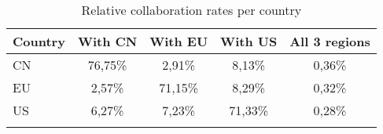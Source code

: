\begin{table}[]
        \centering
    \begin{tabular}{lcccc}
    \hline
    Country & With CN & With EU & With US & All 3 regions \\ \hline
    CN      & 76,75\% & 2,91\%  & 8,13\%  & 0,36\%        \\
    EU      & 2,57\%  & 71,15\% & 8,29\%  & 0,32\%        \\
    US      & 6,27\%  & 7,23\%  & 71,33\% & 0,28\%        \\
            &         &         &         &               \\ \hline
    \end{tabular}
    \caption{Relative collaboration rates per country}
    \label{table:collaboration_percentage}
    \end{table}